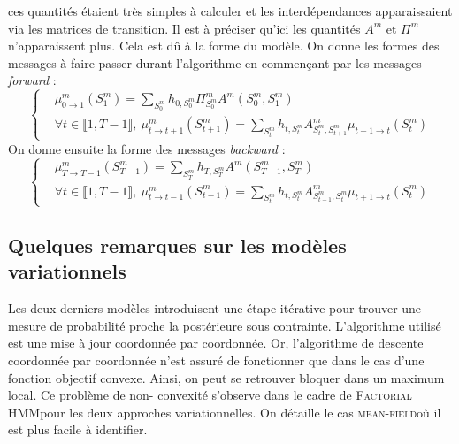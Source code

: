 \documentclass[10pt,a4paper]{article}
\newcommand{\fhmm}{\textsc{Factorial HMM}}
\newcommand{\meanfield}{\textsc{mean-field}}
\begin{document}
ces quantités étaient très simples à calculer et les interdépendances 
apparaissaient via les matrices de transition. Il est à préciser qu'ici les 
quantités $A^m$ et $\Pi^m$ n'apparaissent plus. Cela est dû à la forme du 
modèle. On donne les formes des messages à faire passer durant l'algorithme en 
commençant par les messages \textit{forward} :
\begin{equation}
\left \lbrace
\begin{aligned}
& \mu_{0 \rightarrow 1}^m(S_1^m) = \underset{S_0^m}{\sum} h_{0,S_0^m} 
\Pi^m_{S_0^m} A^m(S_0^m, S_1^m) \\
&\forall t \in \llbracket 1,T-1 \rrbracket, \ \mu_{t \rightarrow 
t+1}^m(S_{t+1}^m)=\underset{S_t^m}{\sum} h_{t,S_t^m} A_{S_t^m,S_{t+1}^m}^m 
\mu_{t-1 \rightarrow t}(S_t^m)
\end{aligned}
\right.
\end{equation}
On donne ensuite la forme des messages \textit{backward} : 
\begin{equation}
\left \lbrace
\begin{aligned}
& \mu_{T \rightarrow T-1}^m(S_{T-1}^m) = \underset{S_T^m}{\sum} h_{T,S_T^m} 
A^m(S_{T-1}^m, S_T^m) \\
&\forall t \in \llbracket 1,T-1 \rrbracket, \ \mu_{t \rightarrow 
t-1}^m(S_{t-1}^m)=\underset{S_t^m}{\sum} h_{t,S_t^m} A_{S_{t-1}^m,S_{t}^m}^m 
\mu_{t+1 \rightarrow t}(S_t^m)
\end{aligned}
\right.
\end{equation}
\subsection{Quelques remarques sur les modèles variationnels}
\label{rqvar}
 Les deux derniers modèles introduisent une étape itérative pour trouver une mesure de probabilité
 proche la postérieure sous contrainte. L'algorithme utilisé est une mise à jour coordonnée par 
 coordonnée. Or, l'algorithme de descente coordonnée par coordonnée n'est assuré de fonctionner que dans  le cas d'une
 fonction objectif convexe. Ainsi, on peut se retrouver bloquer dans un maximum local. Ce problème de non-
 convexité s'observe dans le cadre de \fhmm pour les deux approches variationnelles. On détaille le cas 
 \meanfield où il est plus facile à identifier. 
 
\end{document}
